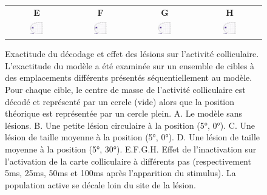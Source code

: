 \begin{figure}
\begin{center}
\begin{tabular}[t]{cc}
    \end{tabular}
    \begin{tabular}[t]{cccc}  
      {\textsf {\textbf E}} &
      {\textsf {\textbf F}} &
      {\textsf {\textbf G}} &
      {\textsf {\textbf H}} \\
      \includegraphics[width=0.23\textwidth]{figures/ch3_6_lesion-after-5} &
      \includegraphics[width=0.23\textwidth]{figures/ch3_6_lesion-after-25} &
      \includegraphics[width=0.23\textwidth]{figures/ch3_6_lesion-after-50} &
      \includegraphics[width=0.23\textwidth]{figures/ch3_6_lesion-after-100}  \\
    \end{tabular}
  \end{center}

  \caption{Exactitude du décodage et effet des lésions sur l'activité colliculaire. L'exactitude du modèle a été examinée sur un ensemble de cibles à des emplacements différents présentés séquentiellement au modèle. Pour chaque cible, le centre de masse de l'activité colliculaire est décodé et représenté par un cercle (vide) alors que la position théorique est représentée par un cercle plein. A. Le modèle sans lésions. B. Une petite lésion circulaire à la position (5°, 0°). C. Une lésion de taille moyenne à la position (5°, 0°). D. Une lésion de taille moyenne à la position (5°, 30°). E.F.G.H. Effet de l'inactivation sur l'activation de la carte colliculaire à différents pas (respectivement 5ms, 25ms, 50ms et 100ms après l'apparition du stimulus). La population active se décale loin du site de la lésion. }
  \label{fig: accuracy}
\end{figure}


